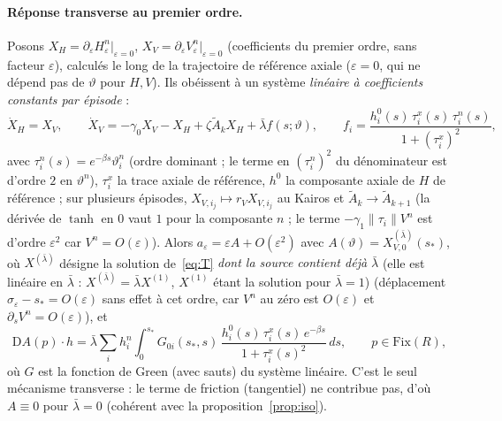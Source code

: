 \documentclass[11pt,a4paper]{article}
\theoremstyle{remark}
\newcommand{\vth}{\vartheta}
\newcommand{\D}{\mathrm D}
\begin{document}
\paragraph{Réponse transverse au premier ordre.} Posons $X_H=\partial_\varepsilon H^n_\varepsilon|_{\varepsilon=0}$, $X_V=\partial_\varepsilon V^n_\varepsilon|_{\varepsilon=0}$ (coefficients du premier ordre, sans facteur $\varepsilon$), calculés le long de la trajectoire de référence axiale ($\varepsilon=0$, qui ne dépend pas de $\vth$ pour $H,V$). Ils obéissent à un système \emph{linéaire à coefficients constants par épisode} :
\begin{equation}\label{eq:T}
\dot X_H=X_V,\qquad \dot X_V=-\gamma_0X_V-X_H+\zeta\widetilde A_kX_H+\bar\lambda f(s;\vth),\qquad f_i=\frac{h_i^0(s)\,\tau_i^x(s)\,\tau_i^n(s)}{1+(\tau_i^x)^2},
\end{equation}
avec $\tau_i^n(s)=e^{-\beta s}\vth_i^n$ (ordre dominant ; le terme en $(\tau^n_i)^2$ du dénominateur est d'ordre $2$ en $\vth^n$), $\tau_i^x$ la trace axiale de référence, $h^0$ la composante axiale de $H$ de référence ; sur plusieurs épisodes, $X_{V,i_j}\mapsto r_VX_{V,i_j}$ au Kairos et $\widetilde A_k\to\widetilde A_{k+1}$ (la dérivée de $\tanh$ en $0$ vaut $1$ pour la composante $n$ ; le terme $-\gamma_1\lVert\tau_i\rVert V^n$ est d'ordre $\varepsilon^2$ car $V^n=O(\varepsilon)$). Alors $a_\varepsilon=\varepsilon A+O(\varepsilon^2)$ avec $A(\vth)=X^{(\bar\lambda)}_{V,0}(s_*)$, où $X^{(\bar\lambda)}$ désigne la solution de~\eqref{eq:T} \emph{dont la source contient déjà $\bar\lambda$} (elle est linéaire en $\bar\lambda$ : $X^{(\bar\lambda)}=\bar\lambda X^{(1)}$, $X^{(1)}$ étant la solution pour $\bar\lambda=1$) (déplacement $\sigma_\varepsilon-s_*=O(\varepsilon)$ sans effet à cet ordre, car $V^n$ au zéro est $O(\varepsilon)$ et $\partial_sV^n=O(\varepsilon)$), et
\[
\D A(p)\cdot h=\bar\lambda\sum_i h_i^n\int_0^{s_*}G_{0i}(s_*,s)\,\frac{h_i^0(s)\,\tau_i^x(s)\,e^{-\beta s}}{1+\tau_i^x(s)^2}\,ds ,\qquad p\in\mathrm{Fix}(R),
\]
où $G$ est la fonction de Green (avec sauts) du système linéaire. C'est le seul mécanisme transverse : le terme de friction (tangentiel) ne contribue pas, d'où $A\equiv0$ pour $\bar\lambda=0$ (cohérent avec la proposition~\ref{prop:iso}).
\end{document}
